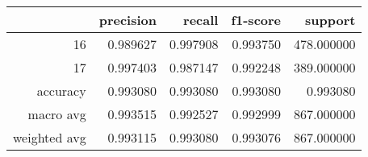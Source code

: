 \begin{table}[h]
\centering
\label{table:5}
\begin{tabular}{rrrrr}
\toprule
 & precision & recall & f1-score & support \\
\midrule
16 & 0.989627 & 0.997908 & 0.993750 & 478.000000 \\
17 & 0.997403 & 0.987147 & 0.992248 & 389.000000 \\
accuracy & 0.993080 & 0.993080 & 0.993080 & 0.993080 \\
macro avg & 0.993515 & 0.992527 & 0.992999 & 867.000000 \\
weighted avg & 0.993115 & 0.993080 & 0.993076 & 867.000000 \\
\bottomrule
\end{tabular}
\end{table}
